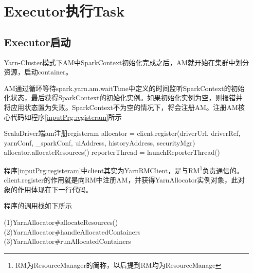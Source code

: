 \chapter{Executor执行Task}
\section{Executor启动}

Yarn-Cluster模式下AM中SparkContext初始化完成之后，AM就开始在集群中划分资源，启动container。

AM通过循环等待spark.yarn.am.waitTime中定义的时间监听SparkContext的初始化状态，最后获得SparkContext的初始化实例。如果初始化实例为空，则报错并将应用状态置为失败。SparkContext不为空的情况下，将会注册AM。注册AM核心代码如程序\ref{inputPrg:registeram}所示
\begin{codeInput}{Scala}{Driver端am注册}{registeram}
allocator = client.register(driverUrl,
driverRef,
yarnConf,
_sparkConf,
uiAddress,
historyAddress,
securityMgr)
allocator.allocateResources()
reporterThread = launchReporterThread()
\end{codeInput}

程序\ref{inputPrg:registeram}中client其实为YarnRMClient，是与RM\footnote{RM为ResourceManager的简称，以后提到RM均为ResourceManage}负责通信的。client.register的作用就是向RM中注册AM，并获得YarnAllocator实例对象，此对象的作用体现在下一行代码。

程序的调用栈如下所示
\begin{orgianlboxnotitle}
	(1)YarnAllocator\#allocateResources()\\
	(2)YarnAllocator\#handleAllocatedContainers\\
	(3)YarnAllocator\#runAllocatedContainers
\end{orgianlboxnotitle}

